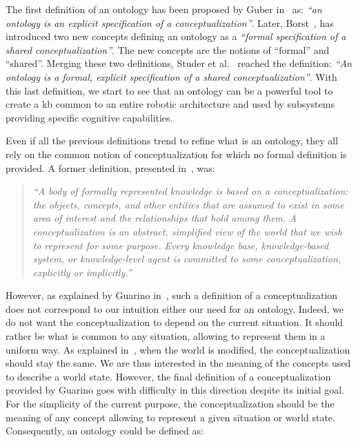 The first definition of an ontology has been proposed by Guber in~\cite{guber_1993_translational} as: \textit{``an ontology is an explicit specification of a conceptualization''}. Later, Borst~\cite{borst_1999_construction}, has introduced two new concepts defining an ontology as a \textit{``formal specification of a shared conceptualization''}. The new concepts are the notions of ``formal'' and ``shared''. Merging these two definitions, Studer et al.~\cite{studer_1998_knowledge} reached the definition: \textit{``An ontology is a formal, explicit specification of a shared conceptualization''}. With this last definition, we start to see that an ontology can be a powerful tool to create a \acrfull{kb} common to an entire robotic architecture and used by subsystems providing specific cognitive capabilities.

Even if all the previous definitions trend to refine what is an ontology, they all rely on the common notion of conceptualization for which no formal definition is provided. A former definition, presented in~\cite{genesereth_1987_logical}, was:

\begin{quote} 
\centering 
\textit{
``A body of formally represented knowledge is based on a conceptualization: the objects, concepts, and other entities that are assumed to exist in some area of interest and the relationships that hold among them. A conceptualization is an abstract, simplified view of the world that we wish to represent for some purpose. Every knowledge base, knowledge-based system, or knowledge-level agent is committed to some conceptualization, explicitly or implicitly.''}
\end{quote}

However, as explained by Guarino in~\cite{guarino_2009_ontology}, such a definition of a conceptualization does not correspond to our intuition either our need for an ontology. Indeed, we do not want the conceptualization to depend on the current situation. It should rather be what is common to any situation, allowing to represent them in a uniform way. As explained in~\cite{guarino_1995_towards}, when the world is modified, the conceptualization should stay the same. We are thus interested in the meaning of the concepts used to describe a world state. However, the final definition of a conceptualization provided by Guarino goes with difficulty in this direction despite its initial goal. For the simplicity of the current purpose, the conceptualization should be the meaning of any concept allowing to represent a given situation or world state. Consequently, an ontology could be defined as:

